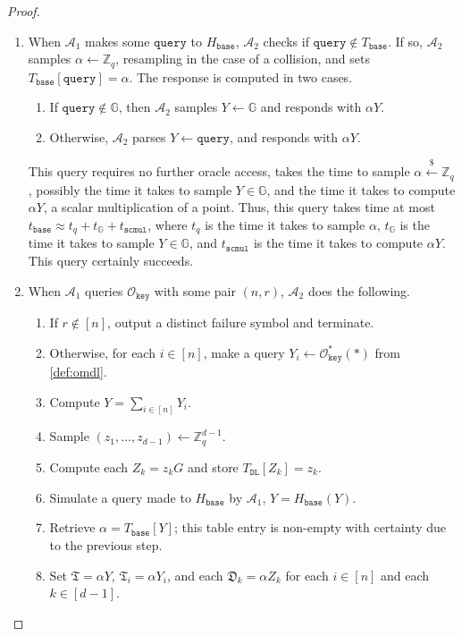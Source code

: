 \documentclass[11pt]{article}
\theoremstyle{definition}
\newcommand{\G}{\mathbb{G}}
\newcommand{\Zq}{\mathbb{Z}_q}
\newcommand{\sample}{\overset{\$}{\leftarrow}}
\newcommand{\keyOracle}{\mathcal{O}_{\texttt{key}}}
\begin{document}
\begin{proof}
\begin{enumerate}
\begin{enumerate}
\item When $\mathcal{A}_1$ makes some $\texttt{query}$ to $H_{\texttt{base}}$, $\mathcal{A}_2$ checks if $\texttt{query} \notin T_{\texttt{base}}$. If so, $\mathcal{A}_2$ samples $\alpha \leftarrow \Zq$, resampling in the case of a collision, and sets $T_{\texttt{base}}[\texttt{query}] = \alpha$. The response is computed in two cases.
\begin{enumerate}
\item If $\texttt{query} \notin \mathbb{G}$, then $\mathcal{A}_2$ samples $Y \leftarrow \mathbb{G}$ and responds with $\alpha Y$.
\item Otherwise, $\mathcal{A}_2$ parses $Y \leftarrow \texttt{query}$, and responds with $\alpha Y$.
\end{enumerate}
This query requires no further oracle access, takes the time to sample $\alpha \sample \Zq$, possibly the time it takes to sample $Y \in \G$, and the time it takes to compute $\alpha Y$, a scalar multiplication of a point. Thus, this query takes time at most $t_{\texttt{base}} \approx t_{q} + t_\mathbb{G} + t_{\texttt{scmul}}$, where $t_q$ is the time it takes to sample $\alpha$, $t_\mathbb{G}$ is the time it takes to sample $Y \in \mathbb{G}$, and $t_{\texttt{scmul}}$ is the time it takes to compute $\alpha Y$. This query certainly succeeds.


\item When $\mathcal{A}_1$ queries $\keyOracle$ with some pair $(n,r)$, $\mathcal{A}_2$ does the following.
\begin{enumerate}
\item If $r \notin [n]$, output a distinct failure symbol and terminate.
\item Otherwise, for each $i \in [n]$, make a query $Y_i \leftarrow \keyOracle^*(\ast)$ from \cref{def:omdl}.
\item Compute $Y = \sum_{i \in [n]} Y_i$.
\item Sample $(z_1, \ldots, z_{d-1}) \leftarrow \Zq^{d-1}$.
\item Compute each $Z_k = z_k G$ and store $T_{\texttt{DL}}[Z_k] = z_k$.
\item Simulate a query made to $H_{\texttt{base}}$ by $\mathcal{A}_1$, $\widehat{Y} = H_{\texttt{base}}(Y)$.
\item Retrieve $\alpha = T_{\texttt{base}}[Y]$; this table entry is non-empty with certainty due to the previous step.
\item Set $\mathfrak{T} = \alpha Y$, $\mathfrak{T}_i = \alpha Y_i$, and each $\mathfrak{D}_k = \alpha Z_k$ for each $i \in [n]$ and each $k \in [d-1]$.


\end{enumerate}
\end{enumerate}
\end{enumerate}
\end{proof}
\end{document}
